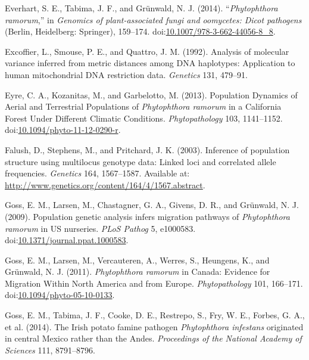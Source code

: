 \documentclass[double,12pt]{beavtex}
\begin{document}
  \hypertarget{ref-everhart2014phytophthora}{}
  Everhart, S. E., Tabima, J. F., and Grünwald, N. J. (2014).
  ``\emph{Phytophthora ramorum},'' in \emph{Genomics of plant-associated
  fungi and oomycetes: Dicot pathogens} (Berlin, Heidelberg: Springer),
  159--174.
  doi:\href{https://doi.org/10.1007/978-3-662-44056-8_8}{10.1007/978-3-662-44056-8\_8}.
  
  \hypertarget{ref-excoffier1992analysis}{}
  Excoffier, L., Smouse, P. E., and Quattro, J. M. (1992). Analysis of
  molecular variance inferred from metric distances among DNA haplotypes:
  Application to human mitochondrial DNA restriction data. \emph{Genetics}
  131, 479--91.
  
  \hypertarget{ref-eyre2013poulation}{}
  Eyre, C. A., Kozanitas, M., and Garbelotto, M. (2013). Population
  Dynamics of Aerial and Terrestrial Populations of \emph{Phytophthora
  ramorum} in a California Forest Under Different Climatic Conditions.
  \emph{Phytopathology} 103, 1141--1152.
  doi:\href{https://doi.org/10.1094/phyto-11-12-0290-r}{10.1094/phyto-11-12-0290-r}.
  
  \hypertarget{ref-Falush01082003}{}
  Falush, D., Stephens, M., and Pritchard, J. K. (2003). Inference of
  population structure using multilocus genotype data: Linked loci and
  correlated allele frequencies. \emph{Genetics} 164, 1567--1587.
  Available at: \url{http://www.genetics.org/content/164/4/1567.abstract}.
  
  \hypertarget{ref-goss2009population}{}
  Goss, E. M., Larsen, M., Chastagner, G. A., Givens, D. R., and Grünwald,
  N. J. (2009). Population genetic analysis infers migration pathways of
  \emph{Phytophthora ramorum} in US nurseries. \emph{PLoS Pathog} 5,
  e1000583.
  doi:\href{https://doi.org/10.1371/journal.ppat.1000583}{10.1371/journal.ppat.1000583}.
  
  \hypertarget{ref-goss2011phytophthora}{}
  Goss, E. M., Larsen, M., Vercauteren, A., Werres, S., Heungens, K., and
  Grünwald, N. J. (2011). \emph{Phytophthora ramorum} in Canada: Evidence
  for Migration Within North America and from Europe.
  \emph{Phytopathology} 101, 166--171.
  doi:\href{https://doi.org/10.1094/phyto-05-10-0133}{10.1094/phyto-05-10-0133}.
  
  \hypertarget{ref-goss2014irish}{}
  Goss, E. M., Tabima, J. F., Cooke, D. E., Restrepo, S., Fry, W. E.,
  Forbes, G. A., et al. (2014). The Irish potato famine pathogen
  \emph{Phytophthora infestans} originated in central Mexico rather than
  the Andes. \emph{Proceedings of the National Academy of Sciences} 111,
  8791--8796.
  
\end{document}
